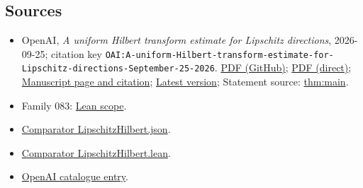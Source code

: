 \documentclass[11pt]{article}
\begin{document}
\subsection{Sources}
\begin{itemize}
\item OpenAI, \emph{A uniform Hilbert transform estimate for Lipschitz directions}, 2026-09-25; citation key \texttt{OAI:A-uniform-Hilbert-transform-estimate-for-Lipschitz-directions-September-25-2026}. \href{https://github.com/openai/math/blob/adc7f1241b42e322a6451854ab7e4b4c146bf78a/preprints/A-uniform-Hilbert-transform-estimate-for-Lipschitz-directions-September-25-2026/main.pdf}{PDF (GitHub)}; \href{https://github.com/openai/math/raw/adc7f1241b42e322a6451854ab7e4b4c146bf78a/preprints/A-uniform-Hilbert-transform-estimate-for-Lipschitz-directions-September-25-2026/main.pdf}{PDF (direct)}; \href{https://github.com/openai/math/blob/adc7f1241b42e322a6451854ab7e4b4c146bf78a/preprints/A-uniform-Hilbert-transform-estimate-for-Lipschitz-directions-September-25-2026/README.md}{Manuscript page and citation}; \href{https://github.com/openai/math/blob/main/preprints/A-uniform-Hilbert-transform-estimate-for-Lipschitz-directions-September-25-2026/main.pdf}{Latest version}; Statement source: \href{https://github.com/openai/math/blob/adc7f1241b42e322a6451854ab7e4b4c146bf78a/preprints/A-uniform-Hilbert-transform-estimate-for-Lipschitz-directions-September-25-2026/build/sections/01-introduction.tex\#L17}{thm:main}.
\item Family 083: \href{https://github.com/openai/math/blob/adc7f1241b42e322a6451854ab7e4b4c146bf78a/lean/docs/083.md}{Lean scope}.
\item \href{https://github.com/openai/math/blob/adc7f1241b42e322a6451854ab7e4b4c146bf78a/lean/ComparatorChallenges/LipschitzHilbert.json}{Comparator LipschitzHilbert.json}.
\item \href{https://github.com/openai/math/blob/adc7f1241b42e322a6451854ab7e4b4c146bf78a/lean/ComparatorChallenges/LipschitzHilbert.lean}{Comparator LipschitzHilbert.lean}.
\item \href{https://github.com/openai/math/blob/adc7f1241b42e322a6451854ab7e4b4c146bf78a/CONTENTS.md}{OpenAI catalogue entry}.
\end{itemize}
\end{document}
